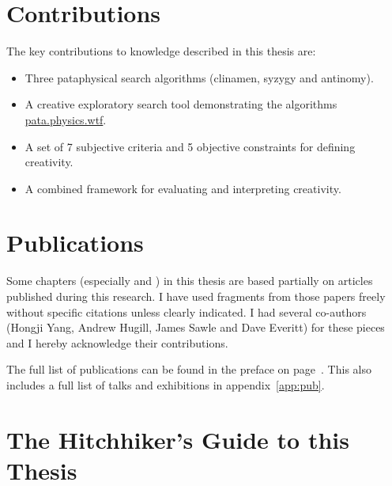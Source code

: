 \section{Contributions}

The key contributions to knowledge described in this thesis are:

\begin{itemize}
  \item Three pataphysical search algorithms (clinamen, syzygy and antinomy).
  \item A creative exploratory search tool demonstrating the algorithms \url{pata.physics.wtf}.
  \item A set of 7 subjective criteria and 5 objective constraints for defining creativity.
  \item A combined framework for evaluating and interpreting creativity.
\end{itemize}





\section{Publications}

Some chapters (especially  and ) in this thesis are based partially on articles published during this research. I have used fragments from those papers freely without specific citations unless clearly indicated. I had several co-authors (Hongji Yang, Andrew Hugill, James Sawle and Dave Everitt) for these pieces and I hereby acknowledge their contributions.

The full list of publications can be found in the preface on page~\pageref{pre:pub}. This also includes a full list of talks and exhibitions in appendix~\ref{app:pub}.


\section{The Hitchhiker's Guide to this Thesis}

